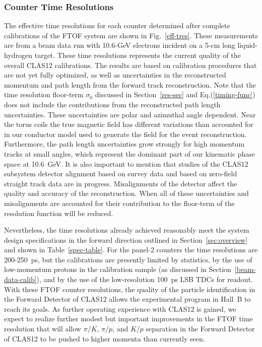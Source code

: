 \documentclass[3p,times,twocolumn]{elsarticle}
\begin{document}
\subsubsection{Counter Time Resolutions}
\label{tres-beam}

The effective time resolutions for each counter determined after complete calibrations of the FTOF
system are shown in Fig.~\ref{eff-tres}. These measurements are from a beam data run with 10.6-GeV
electrons incident on a 5-cm long liquid-hydrogen target. These time resolutions represents the current
quality of the overall CLAS12 calibrations. The results are based on calibration procedures that are not
yet fully optimized, as well as uncertainties in the reconstructed momentum and path length from the
forward track reconstruction. Note that the time resolution floor-term $\sigma_0$ discussed in
Section~\ref{res-sec} and Eq.(\ref{timing-func}) does not include the contributions from the
reconstructed path length uncertainties. These uncertainties are polar and azimuthal angle dependent.
Near the torus coils the true magnetic field has different variations than accounted for in our conductor
model used to generate the field for the event reconstruction. Furthermore, the path length uncertainties
grow strongly for high momentum tracks at small angles, which represent the dominant part of our kinematic
phase space at 10.6~GeV. It is also important to mention that studies of the CLAS12 subsystem detector
alignment based on survey data and based on zero-field straight track data are in progress. Misalignments
of the detector affect the quality and accuracy of the reconstruction. When all of these uncertainties and
misalignments are accounted for their contribution to the floor-term of the resolution function will be
reduced.

Nevertheless, the time resolutions already achieved reasonably meet the system design specifications in the
forward direction outlined in Section~\ref{sec:overview} and shown in Table~\ref{spec-table}. For the
panel-2 counters the time resolutions are 200-250~ps, but the calibrations are presently limited by statistics,
by the use of low-momentum protons in the calibration sample (as discussed in Section~\ref{beam-data-calib}),
and by the use of the low-resolution 100~ps LSB TDCs for readout. With these FTOF counter resolutions, the
quality of the particle identification in the Forward Detector of CLAS12 allows the experimental program in
Hall~B to reach its goals. As further operating experience with CLAS12 is gained, we expect to realize further
modest but important improvements in the FTOF time resolution that will allow $\pi/K$, $\pi/p$, and $K/p$
separation in the Forward Detector of CLAS12 to be pushed to higher momenta than currently seen.
\end{document}
